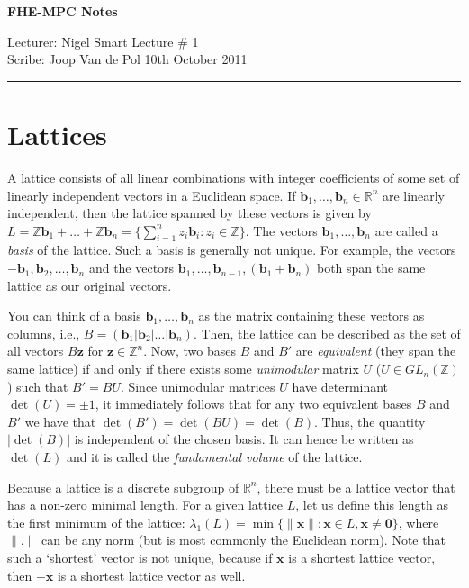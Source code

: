 \documentclass{article}[11pt]
\newcommand{\bfb}{\mathbf{b}}
\newcommand{\bfx}{\mathbf{x}}
\newcommand{\bfz}{\mathbf{z}}
\newcommand{\bfzero}{\mathbf{0}}
\newcommand{\R}{{\mathbb R}}
\newcommand{\Z}{{\mathbb Z}}
\newcommand*{\sumi}[3]{{\sum_{#1 = #2}^{#3}}}
\begin{document}
\thispagestyle{empty}
\begin{center}
\bf\large FHE-MPC Notes
\end{center}

\noindent
Lecturer:                Nigel Smart
\hfill
Lecture \#               1
\\
Scribe:                  Joop Van de Pol
\hfill
                         10th October 2011

\noindent
\rule{\textwidth}{1pt}

\medskip

\section*{Lattices}
A lattice consists of all linear combinations with integer coefficients of some set of linearly independent vectors in a Euclidean space. If $\bfb_1,\ldots,\bfb_n \in \R^n$ are linearly independent, then the lattice spanned by these vectors is given by $L = \Z\bfb_1 + \ldots + \Z\bfb_n = \{\sumi{i}{1}{n} 
z_i\bfb_i : z_i \in \Z\}$. The vectors $\bfb_1,\ldots,\bfb_n$ are called a {\it basis} of the lattice. Such a basis is generally not unique. For example, the vectors $-\bfb_1,\bfb_2,\ldots,\bfb_n$ and the vectors $\bfb_1, \ldots, \bfb_{n-1}, (\bfb_1+ \bfb_n)$ both span the same lattice as our original vectors. 

You can think of a basis $\bfb_1,\ldots,\bfb_n$ as the matrix containing these vectors as columns, i.e., $B = (\bfb_1|\bfb_2|\ldots|\bfb_n)$. Then, the lattice can be described as the set of all vectors $B\bfz$ for $\bfz\in \Z^n$. Now, two bases $B$ and $B'$ are {\it equivalent} (they span the same lattice) if and only if there exists some {\it unimodular} matrix $U$ ($U\in GL_n(\Z)$) such that $B' = BU$. Since unimodular matrices $U$ have determinant $\det(U) = \pm 1$, it immediately follows that for any two equivalent bases $B$ and $B'$ we have that $\det(B') = \det(BU) = \det(B)$. Thus, the quantity $|\det(B)|$ is independent of the chosen basis. It can hence be written as $\det(L)$ and it is called the {\it fundamental volume} of the lattice. 

Because a lattice is a discrete subgroup of $\R^n$, there must be a lattice vector that has a non-zero minimal length. For a given lattice $L$, let us define this length as the first minimum of the lattice: $\lambda_{1}(L) = \min\{\|\bfx\|: \bfx \in L, \bfx \neq \bfzero\}$, where $\|.\|$ can be any norm (but is most commonly the Euclidean norm). Note that such a `shortest' vector is not unique, because if $\bfx$ is a shortest lattice vector, then $-\bfx$ is a shortest lattice vector as well. 
\end{document}
